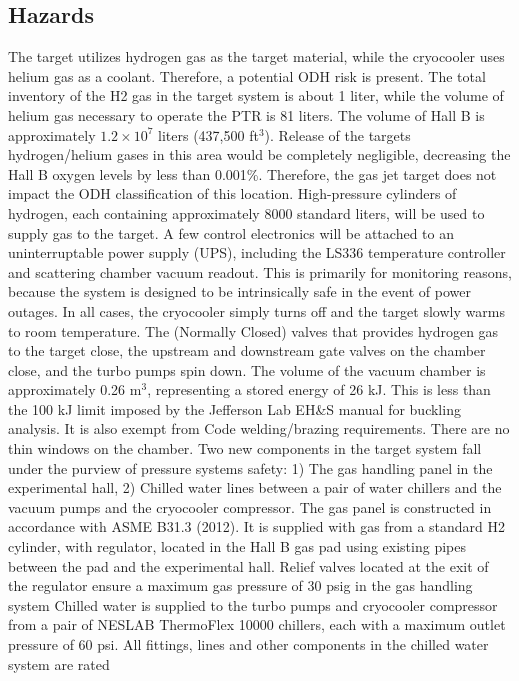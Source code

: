 \subsection{Hazards}
The target utilizes hydrogen gas as the target material, while the cryocooler uses helium
gas as a coolant. Therefore, a potential ODH risk is present. The total inventory of the
H2 gas in the target system is about 1 liter, while the volume of helium gas necessary
to operate the PTR is 81 liters. The volume of Hall B is approximately $1.2 \times  10^7$
liters (437,500 ft$^3$). Release of the targets hydrogen/helium gases in this area would be
completely negligible, decreasing the Hall B oxygen levels by less than 0.001\%. Therefore,
the gas jet target does not impact the ODH classification of this location. High-pressure
cylinders of hydrogen, each containing approximately 8000 standard liters, will be used
to supply gas to the target.
A few control electronics will be attached to an uninterruptable power supply (UPS),
including the LS336 temperature controller and scattering chamber vacuum readout.
This is primarily for monitoring reasons, because the system is designed to be intrinsically safe in the event of power outages. In all cases, the cryocooler simply turns off
and the target slowly warms to room temperature. The (Normally Closed) valves that
provides hydrogen gas to the target close, the upstream and downstream gate valves on
the chamber close, and the turbo pumps spin down.
The volume of the vacuum chamber is approximately 0.26 m$^3$, representing a stored
energy of 26 kJ. This is less than the 100 kJ limit imposed by the Jefferson Lab EH\&S
manual for buckling analysis. It is also exempt from Code welding/brazing requirements.
There are no thin windows on the chamber.
Two new components in the target system fall under the purview of pressure systems
safety:
1) The gas handling panel in the experimental hall,
2) Chilled water lines between a pair of water chillers and the vacuum pumps and the
cryocooler compressor.
The gas panel is constructed in accordance with ASME B31.3 (2012). It is supplied
with gas from a standard H2 cylinder, with regulator, located in the Hall B gas pad
using existing pipes between the pad and the experimental hall. Relief valves located at
the exit of the regulator ensure a maximum gas pressure of 30 psig in the gas handling
system
Chilled water is supplied to the turbo pumps and cryocooler compressor from a
pair of NESLAB ThermoFlex 10000 chillers, each with a maximum outlet pressure of
60 psi. All fittings, lines and other components in the chilled water system are rated
